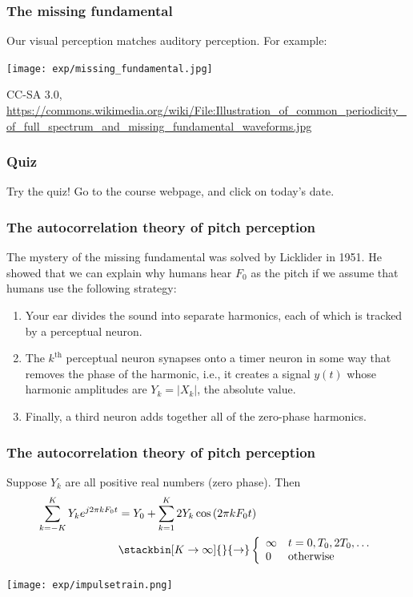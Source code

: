 \documentclass{beamer}
\begin{document}
\begin{frame}
  \frametitle{The missing fundamental}

  Our visual perception matches auditory perception. For example:
  \centerline{\texttt{[image: exp/missing\_fundamental.jpg]}}
  {\small CC-SA 3.0, \url{https://commons.wikimedia.org/wiki/File:Illustration_of_common_periodicity_of_full_spectrum_and_missing_fundamental_waveforms.jpg}}
  
\end{frame}

\begin{frame}
  \frametitle{Quiz}

  Try the quiz! Go to the course webpage, and click on today's date.
\end{frame}

\begin{frame}
  \frametitle{The autocorrelation theory of pitch perception}

  The mystery of the missing fundamental was solved by Licklider in
  1951.  He showed that we can explain why humans hear $F_0$ as the
  pitch if we assume that humans use the following strategy:
  \begin{enumerate}
  \item Your ear divides the sound into separate harmonics, each of
    which is tracked by a perceptual neuron.
  \item The $k^{\text{th}}$ perceptual neuron synapses onto a timer
    neuron in some way that removes the phase of the harmonic, i.e.,
    it creates a signal $y(t)$ whose harmonic amplitudes are
    $Y_k=|X_k|$, the absolute value.
  \item Finally, a third neuron adds together all of the zero-phase
    harmonics.
  \end{enumerate}
\end{frame}

\begin{frame}
  \frametitle{The autocorrelation theory of pitch perception}

  Suppose $Y_k$ are all positive real numbers (zero phase).  Then
  \begin{align*}
    \sum_{k=-K}^K Y_k e^{j2\pi kF_0t}
    &=  Y_0+ \sum_{k=1}^K 2Y_k\cos\left(2\pi kF_0t\right)\\
    &\stackbin[K\rightarrow\infty]{}{\rightarrow}
    \left\{\begin{array}{ll}
    \infty & t=0,T_0,2T_0,\ldots\\
    0 &\mbox{otherwise}
    \end{array}\right.
  \end{align*}
  \centerline{\texttt{[image: exp/impulsetrain.png]}}
\end{frame}
\end{document}
